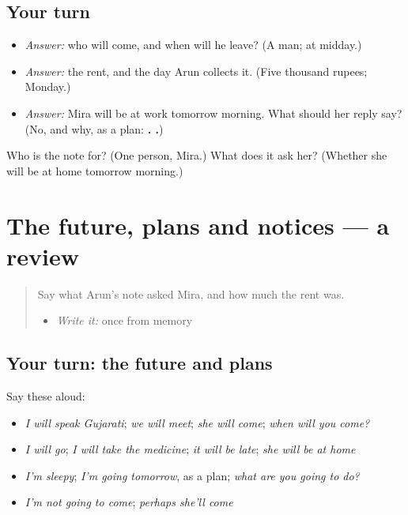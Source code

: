 \subsection*{Your turn}
\begin{itemize}
\raggedright
  \item \emph{Answer:} who will come, and when will he leave? (A man; at midday.)
  \item \emph{Answer:} the rent, and the day Arun collects it. (Five thousand rupees; Monday.)
  \item \emph{Answer:} Mira will be at work tomorrow morning. What should her reply say? (No, and why, as a plan: \textbf{.    .})
\end{itemize}

\begin{tcolorbox}[breakable,colback=teal!4,colframe=teal!35!black,title={Before you move on}]
Who is the note for? (One person, Mira.) What does it ask her? (Whether she will be at home tomorrow morning.)
\end{tcolorbox}
\section[(dialogue)]{The future, plans and notices — a review}

\label{lesson:GU-R152-first-pass-future-notices}



\begin{quote}
Say what Arun's note asked Mira, and how much the rent was.

\begin{itemize}
\raggedright
  \item \emph{Write it:} \textbf{} once from memory
\end{itemize}
\end{quote}

\subsection*{Your turn: the future and plans}
Say these aloud:

\begin{itemize}
\raggedright
  \item \emph{I will speak Gujarati}; \emph{we will meet}; \emph{she will come}; \emph{when will you come?}
  \item \emph{I will go}; \emph{I will take the medicine}; \emph{it will be late}; \emph{she will be at home}
  \item \emph{I'm sleepy}; \emph{I'm going tomorrow}, as a plan; \emph{what are you going to do?}
  \item \emph{I'm not going to come}; \emph{perhaps she'll come}
\end{itemize}

